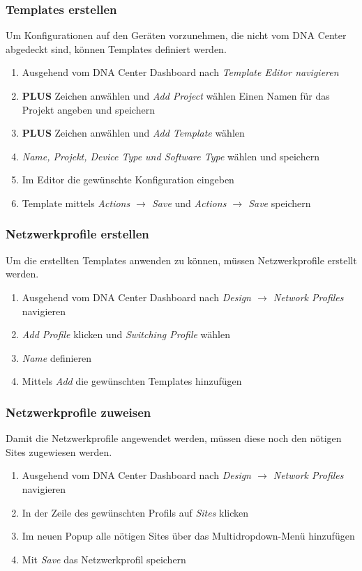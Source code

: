 \subsubsection{Templates erstellen}
Um Konfigurationen auf den Geräten vorzunehmen, die nicht vom DNA Center abgedeckt sind, können Templates definiert werden.
\begin{enumerate}
	\item Ausgehend vom DNA Center Dashboard nach \textit{Template Editor navigieren}
	\item \textbf{PLUS} Zeichen anwählen und \textit{Add Project} wählen
	\subitem Einen Namen für das Projekt angeben und speichern
	\item \textbf{PLUS} Zeichen anwählen und \textit{Add Template} wählen
	\item \textit{Name, Projekt, Device Type und Software Type} wählen und speichern
	\item Im Editor die gewünschte Konfiguration eingeben
	\item Template mittels \textit{Actions $\rightarrow$ Save} und \textit{Actions $\rightarrow$ Save} speichern
\end{enumerate}

\subsubsection{Netzwerkprofile erstellen}
Um die erstellten Templates anwenden zu können, müssen Netzwerkprofile erstellt werden.
\begin{enumerate}
	\item Ausgehend vom DNA Center Dashboard nach \textit{Design $\rightarrow$ Network Profiles} navigieren
	\item \textit{Add Profile} klicken und \textit{Switching Profile} wählen
	\item \textit{Name} definieren
	\item Mittels \textit{Add} die gewünschten Templates hinzufügen
\end{enumerate}

\subsubsection{Netzwerkprofile zuweisen}
Damit die Netzwerkprofile angewendet werden, müssen diese noch den nötigen Sites zugewiesen werden.
\begin{enumerate}
	\item Ausgehend vom DNA Center Dashboard nach \textit{Design $\rightarrow$ Network Profiles} navigieren
	\item In der Zeile des gewünschten Profils auf \textit{Sites} klicken
	\item Im neuen Popup alle nötigen Sites über das Multidropdown-Menü hinzufügen
	\item Mit \textit{Save} das Netzwerkprofil speichern
\end{enumerate}

